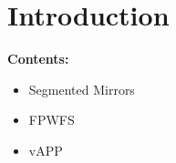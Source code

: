 
\chapter{Introduction} %

\noindent\textbf{\large Contents:}

\noindent\hrulefill
\noindent\startcontents[chapters]
\noindent{}
\noindent\hrulefill

\label{Chapter1} %



\begin{itemize}
    \item Segmented Mirrors
    \item FPWFS
    \item vAPP
\end{itemize}



